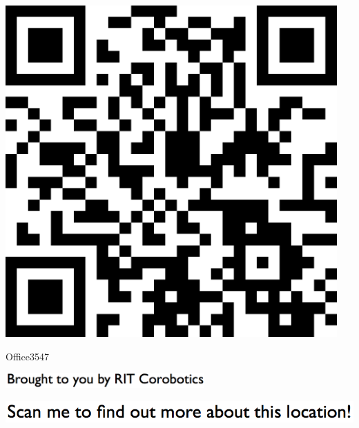 \documentclass[letterpaper]{article}
\begin{document}
 \begingroup 
 \centerline{\includegraphics[scale=1,width=5in,height=5in]{Office3547.png}} 
 \endgroup 
 \vspace*{\fill} 

 \hfill{\small Office3547} 

  \vspace{0.7in} 
 
 \centerline{\includegraphics[scale=1,width=3in]{text-bottom.png}} 
 
 \pagebreak 
{} 
 \vspace*{\fill} 
 
  \centerline{\includegraphics[scale=1,width=6in]{text-top.png}} 
 
 \vspace{0.5in} 
 
\end{document}

